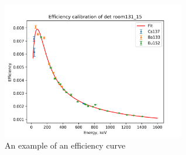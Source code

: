 \documentclass[a4paper,11pt,twoside]{book}
\begin{document}
\begin{figure}
    \centering
    \includegraphics[width=8cm]{Experiment/room131_15.png}
    \caption{An example of an efficiency curve}
    \label{fig:efficiency_curve}
\end{figure}
\end{document}

